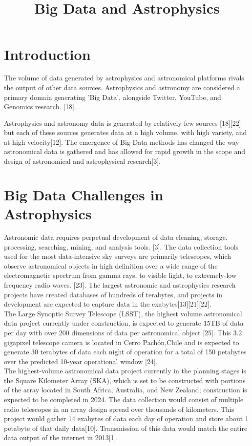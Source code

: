 \documentclass[letterpaper]{report}
\begin{document}
\title{Big Data and Astrophysics}
\maketitle

\section{Introduction}
The volume of data generated by astrophysics and astronomical platforms rivals the output of other data sources. Astrophysics and astronomy are considered a primary domain generating 'Big Data', alongside Twitter, YouTube, and Genomics research. [18]. 

Astrophysics and astronomy data is generated by relatively few sources [18][22] but each of these sources generates data at a high volume, with high variety, and at high velocity[12]. The emergence of Big Data methods has changed the way astronomical data is gathered and has allowed for rapid growth in the scope and design of astronomical and astrophysical research[3]. 

\section{Big Data Challenges in Astrophysics}
Astronomic data requires perpetual development of data cleaning, storage, processing, searching, mining, and analysis tools. [3]. The data collection tools used for the most data-intensive sky surveys are primarily telescopes, which observe astronomical objects in high definition over a wide range of the electromagnetic spectrum from gamma rays, to visible light, to extremely-low frequency radio waves. [23]. The largest astronomic and astrophysics research projects have created databases of hundreds of terabytes, and projects in development are expected to capture data in the exabytes[13][21][22]. \\

The Large Synoptic Survey Telescope (LSST), the highest volume astronomical data project currently under construction, is expected to generate 15TB of data per day with over 200 dimensions of data per astronomical object [25]. This 3.2 gigapixel telescope camera is located in Cerro Pachón,Chile and is expected to generate 30 terabytes of data each night of operation for a total of 150 petabytes over the predicted 10-year operational window [24]. \\

The highest-volume astronomical data project currently in the planning stages is the Square Kilometer Array (SKA), which is set to be constructed with portions of the array located in South Africa, Australia, and New Zealand; construction is expected to be completed in 2024. The data collection would consist of multiple radio telescopes in an array design spread over thousands of kilometers. This project would gather 14 exabytes of data each day of operation and store about 1 petabyte of that daily data[10]. Transmission of this data would match the entire data output of the internet in 2013[1]. \\
\end{document}
